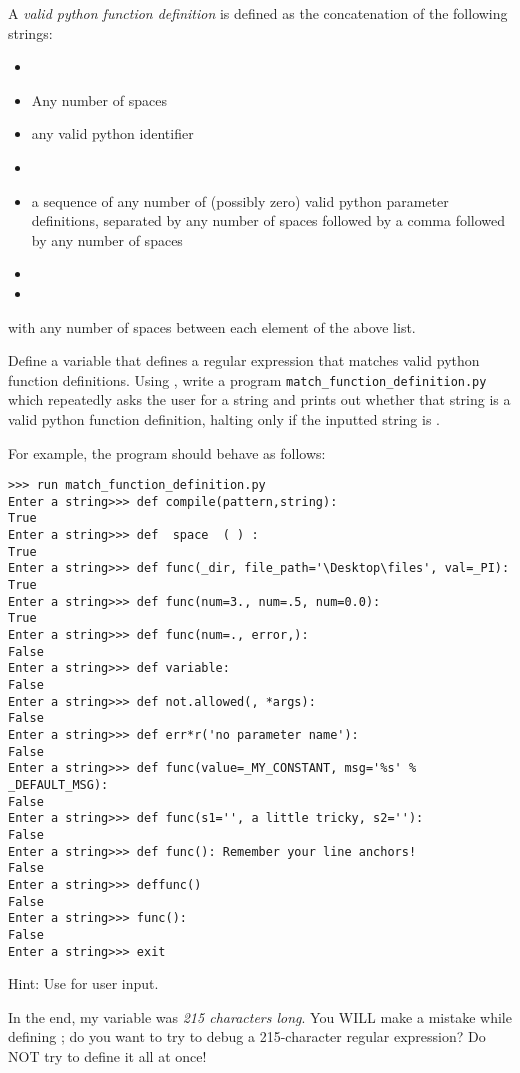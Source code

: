 \begin{problem*}
A \emph{valid python function definition} is defined as the concatenation of the following strings:
\begin{itemize}
    \item {}
    \item Any number of spaces
    \item any valid python identifier
    \item {}
    \item a sequence of any number of (possibly zero) valid python parameter definitions, separated by any number of spaces followed by a comma followed by any number of spaces
    \item {}
    \item {}
\end{itemize}
with any number of spaces between each element of the above list.

Define a variable  that defines a regular expression that matches valid python function definitions. Using 
, write a program \texttt{match\_function\_definition.py}
which repeatedly asks the user for a string and prints out whether that string is a valid python function definition, halting only if the inputted string is .

For example, the program should behave as follows:
\begin{lstlisting}
>>> run match_function_definition.py
Enter a string>>> def compile(pattern,string):
True
Enter a string>>> def  space  ( ) :
True
Enter a string>>> def func(_dir, file_path='\Desktop\files', val=_PI):
True
Enter a string>>> def func(num=3., num=.5, num=0.0):
True
Enter a string>>> def func(num=., error,):
False
Enter a string>>> def variable:
False
Enter a string>>> def not.allowed(, *args):
False
Enter a string>>> def err*r('no parameter name'):
False
Enter a string>>> def func(value=_MY_CONSTANT, msg='%s' % _DEFAULT_MSG):
False
Enter a string>>> def func(s1='', a little tricky, s2=''):
False
Enter a string>>> def func(): Remember your line anchors!
False
Enter a string>>> deffunc()
False
Enter a string>>> func():
False
Enter a string>>> exit

\end{lstlisting}
Hint: Use  for user input.

\begin{warn}
In the end, my variable  was \emph{215 characters long}. You WILL make a mistake while defining ; do you want to try to debug a 215-character regular expression? Do NOT try to define it all at once!


\end{warn}
\end{problem*}

